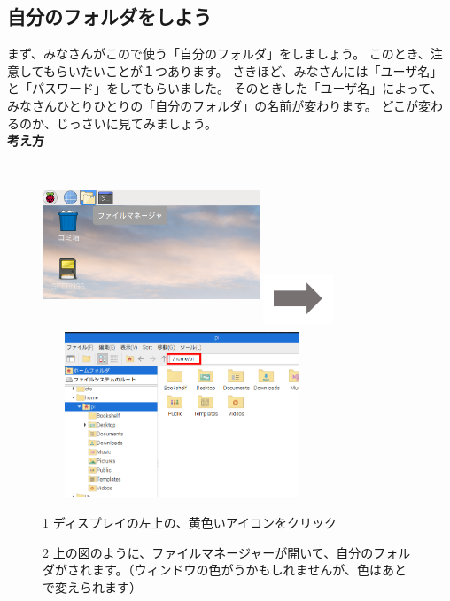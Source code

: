 \documentclass[a4paper,12pt]{jarticle}
\begin{document}
\clearpage

\subsection{\theExercise 自分のフォルダをしよう}
まず、みなさんがこので使う「自分のフォルダ」をしましょう。
このとき、注意してもらいたいことが１つあります。
さきほど、みなさんには「ユーザ名」と「パスワード」をしてもらいました。
そのときした「ユーザ名」によって、みなさんひとりひとりの「自分のフォルダ」の名前が変わります。
どこが変わるのか、じっさいに見てみましょう。\\

{\bf \large 考え方}\\
\begin{figure}[ht]
\begin{minipage}{\textwidth}
  \includegraphics[width=6.472cm,height=4.976cm]{textbook-img032.png}
  \includegraphics[width=2.094cm,height=1.771cm]{textbook-img035.png}
  \includegraphics[width=8.301cm,height=4.948cm]{textbook-img1020.png}
\end{minipage}
\begin{minipage}{0.4\textwidth}
  1
  ディスプレイの左上の、黄色いアイコンをクリック
\end{minipage}
\vspace{20pt}
\hfill
\begin{minipage}{0.4\textwidth}
  2
  上の図のように、ファイルマネージャーが開いて、自分のフォルダがされます。（ウィンドウの色がうかもしれませんが、色はあとで変えられます）
\end{minipage}
\end{figure}
\end{document}

